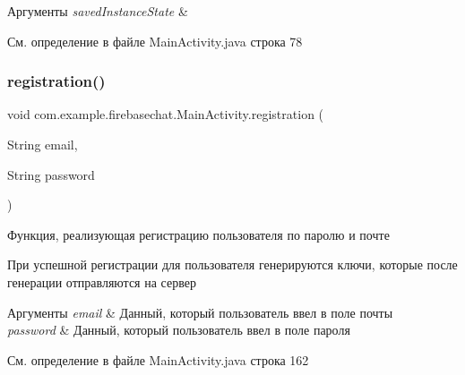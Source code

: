 \begin{DoxyParams}{Аргументы}
{\em saved\+Instance\+State} & \\
\hline
\end{DoxyParams}


См. определение в файле Main\+Activity.\+java строка 78

\mbox{\label{classcom_1_1example_1_1firebasechat_1_1_main_activity_a95140ec9da54a87bc49b6ba1023cb8bd}} 
\subsubsection{\texorpdfstring{registration()}{registration()}}
{\footnotesize\ttfamily void com.\+example.\+firebasechat.\+Main\+Activity.\+registration (\begin{DoxyParamCaption}\item[{String}]{email,  }\item[{String}]{password }\end{DoxyParamCaption})}



Функция, реализующая регистрацию пользователя по паролю и почте 

При успешной регистрации для пользователя генерируются ключи, которые после генерации отправляются на сервер 
\begin{DoxyParams}{Аргументы}
{\em email} & Данный, который пользователь ввел в поле почты \\
\hline
{\em password} & Данный, который пользователь ввел в поле пароля \\
\hline
\end{DoxyParams}


См. определение в файле Main\+Activity.\+java строка 162

\mbox{\label{classcom_1_1example_1_1firebasechat_1_1_main_activity_ab05b9f3c667fd2a59b127fdf24f7af8f}} 
